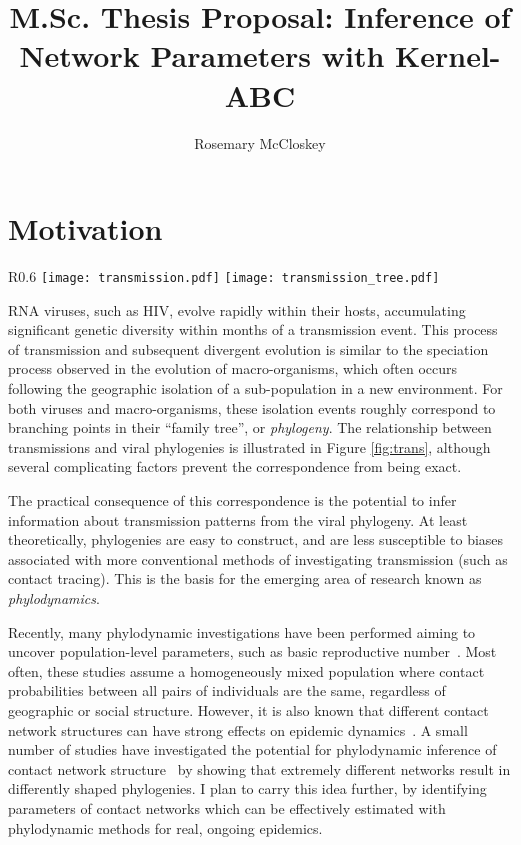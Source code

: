 \documentclass{article}
\author{Rosemary McCloskey}
\title{M.Sc. Thesis Proposal: Inference of Network Parameters with Kernel-ABC}
\begin{document}
\maketitle

\section{Motivation}

\begin{wrapfigure}{R}{0.6\textwidth}
    \centering
    \texttt{[image: transmission.pdf]}
    \texttt{[image: transmission\_tree.pdf]}
    \caption{Correspondence between transmission events (left) and viral
    phylogeny (right).}
    \label{fig:trans}
\end{wrapfigure}

RNA viruses, such as HIV, evolve rapidly within their hosts, accumulating
significant genetic diversity within months of a transmission event. This
process of transmission and subsequent divergent evolution is similar to the
speciation process observed in the evolution of macro-organisms, which often
occurs following the geographic isolation of a sub-population in a new
environment. For both viruses and macro-organisms, these isolation events
roughly correspond to branching points in their ``family tree'', or
\emph{phylogeny}. The relationship between transmissions and viral phylogenies
is illustrated in Figure \ref{fig:trans}, although several complicating factors
prevent the correspondence from being exact.

The practical consequence of this correspondence is the potential to infer
information about transmission patterns from the viral phylogeny. At least
theoretically, phylogenies are easy to construct, and are less susceptible to
biases associated with more conventional methods of investigating transmission
(such as contact tracing). This is the basis for the emerging area of research
known as \emph{phylodynamics}.

Recently, many phylodynamic investigations have been performed aiming to
uncover population-level parameters, such as basic reproductive
number~\cite{stadler2014insights}. Most often, these studies assume a
homogeneously mixed population where contact probabilities between all pairs of
individuals are the same, regardless of geographic or social structure.
However, it is also known that different contact network structures can have
strong effects on epidemic dynamics~\cite{volz2009epidemic}. A small number of
studies have investigated the potential for phylodynamic inference of contact
network structure~\cite{colijn2014phylogenetic,leventhal2012inferring} by
showing that extremely different networks result in differently shaped
phylogenies. I plan to carry this idea further, by identifying parameters of
contact networks which can be effectively estimated with phylodynamic methods
for real, ongoing epidemics.
\end{document}
